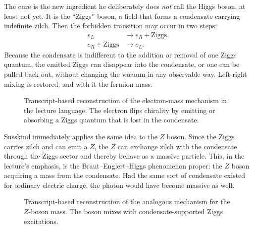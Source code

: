 The cure is the new ingredient he deliberately does \emph{not} call the Higgs boson, at least not yet. It is the ``Ziggs'' boson, a field that forms a condensate carrying indefinite zilch. Then the forbidden transition may occur in two steps:
\begin{align}
e_{L} &\to e_{R}+\mathrm{Ziggs},\\
e_{R}+\mathrm{Ziggs} &\to e_{L}.
\end{align}
Because the condensate is indifferent to the addition or removal of one Ziggs quantum, the emitted Ziggs can disappear into the condensate, or one can be pulled back out, without changing the vacuum in any observable way. Left-right mixing is restored, and with it the fermion mass.

\begin{figure}
\centering
{}
\caption{Transcript-based reconstruction of the electron-mass mechanism in the lecture language. The electron flips chirality by emitting or absorbing a Ziggs quantum that is lost in the condensate.}
\end{figure}

Susskind immediately applies the same idea to the \(Z\) boson. Since the Ziggs carries zilch and can emit a \(Z\), the \(Z\) can exchange zilch with the condensate through the Ziggs sector and thereby behave as a massive particle. This, in the lecture's emphasis, is the Braut--Englert--Higgs phenomenon proper: the \(Z\) boson acquiring a mass from the condensate. Had the same sort of condensate existed for ordinary electric charge, the photon would have become massive as well.

\begin{figure}
\centering
{}
\caption{Transcript-based reconstruction of the analogous mechanism for the \(Z\)-boson mass. The boson mixes with condensate-supported Ziggs excitations.}
\end{figure}

